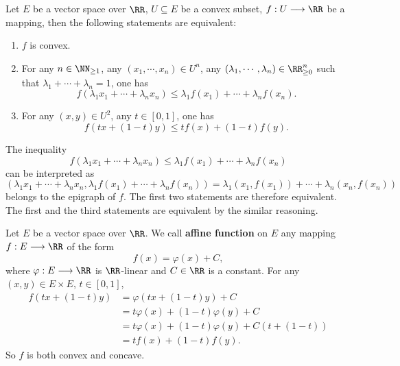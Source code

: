 \begin{theoremenv}
    Let $E$ be a vector space over $\RR$, $U \subseteq E$ be a convex subset,
    $f : U \longrightarrow \RR$ be a mapping, then the following statements are equivalent:
    \begin{enumerate}[label=(\arabic*)]
        \item $f$ is convex.
        \item For any $n \in \NN_{\ge 1}$, any $(x_1,\cdots,x_n) \in U^n$, any $(\lambda_1,\cdots,\lambda_n) \in \RR_{\ge 0}^n$ such that $\lambda_1 + \cdots + \lambda_n = 1$, one has
            $$f(\lambda_1 x_1 + \cdots + \lambda_n x_n) \le \lambda_1 f(x_1) + \cdots + \lambda_n f(x_n).$$
        \item  For any $(x,y) \in U^2$, any $t \in [0,1]$, one has
            $$f(tx + (1-t)y) \le t f(x) + (1-t)f(y).$$
    \end{enumerate}
\end{theoremenv}
\begin{proofenv}
    The inequality
    $$f(\lambda_1 x_1 + \cdots + \lambda_n x_n) \le \lambda_1 f(x_1) + \cdots + \lambda_n f(x_n)$$
    can be interpreted as
    $$(\lambda_1 x_1 + \cdots + \lambda_n x_n, \lambda_1 f(x_1) + \cdots + \lambda_n f(x_n)) = \lambda_1 (x_1,f(x_1)) + \cdots + \lambda_n (x_n,f(x_n))$$
    belongs to the epigraph of $f$.
    The first two statements are therefore equivalent.
    The first and the third statements are equivalent by the similar reasoning.
\end{proofenv}

\begin{definitionenv}
    Let $E$ be a vector space over $\RR$.
    We call \textbf{affine function} on $E$ any mapping $f : E \longrightarrow \RR$ of the form
    $$f(x) = \varphi(x) + C,$$
    where $\varphi : E \longrightarrow \RR$ is $\RR$-linear and $C \in \RR$ is a constant.
    For any $(x,y) \in E \times E$, $t \in [0,1]$,
    $$\begin{aligned}
        f(tx + (1 - t)y)
        &= \varphi (tx + (1 - t)y) + C\\
        &= t \varphi(x) + (1 - t)\varphi(y) + C\\
        &= t \varphi(x) + (1 - t)\varphi(y) + C(t + (1 - t))\\
        &= t f(x) + (1 - t) f(y).
    \end{aligned}$$
    So $f$ is both convex and concave.
\end{definitionenv}


